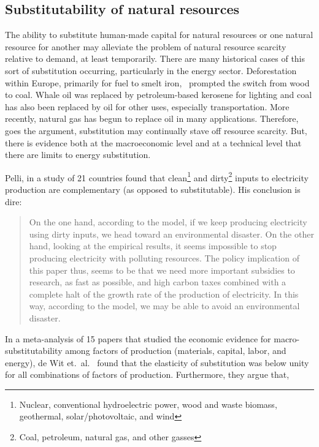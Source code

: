 \subsection{Substitutability of natural resources}

The ability to substitute human-made capital for natural resources
or one natural resource for another 
may alleviate the problem of natural resource scarcity relative to demand,
at least temporarily.
There are many historical cases of this sort of substitution occurring,
particularly in the energy sector.
Deforestation within Europe,
primarily for fuel to smelt iron,~\cite{Smil1994}
prompted the switch from wood to coal.
Whale oil was replaced by petroleum-based kerosene for lighting and
coal has also been replaced by oil for other uses, 
especially transportation.\cite{Weissenbacher2009}
More recently, natural gas has begun to replace oil in many applications.
Therefore, goes the argument, 
substitution may continually stave off resource scarcity.
But, there is evidence both at the macroeconomic level and 
at a technical level that there are limits to energy substitution.

Pelli, in a study of 21 countries 
found that clean\footnote{Nuclear, 
	conventional hydroelectric power, wood and waste biomass, 
	geothermal, solar/photovoltaic, and wind
	}
and dirty\footnote{Coal, 
	petroleum, natural gas, and other gasses
	}
inputs to electricity production
are complementary (as opposed to substitutable).\cite{Pelli:2012wv}
His conclusion is dire:

\begin{quote}
	On the one hand, according to the model, 
	if we keep producing electricity using dirty inputs, 
	we head toward an environmental disaster. 
	On the other hand, looking at the empirical results, 
	it seems impossible to stop producing electricity with polluting resources. 
	The policy implication of this paper thus, 
	seems to be that we need more important subsidies to research, 
	as fast as possible, 
	and high carbon taxes combined with a complete halt 
	of the growth rate of the production of electricity. 
	In this way, according to the model, 
	we may be able to avoid an environmental disaster.\cite[p.~25]{Pelli:2012wv}
\end{quote}

In a meta-analysis of 15 papers that studied 
the economic evidence for macro-substitutability
among factors of production (materials, capital, labor, and energy), 
de Wit et.\ al.\ \cite{de-Wit:2013aa} found that the elasticity of substitution was 
below unity for all combinations of factors of production.
Furthermore, they argue that, 

